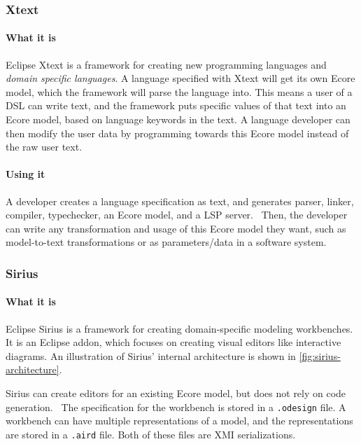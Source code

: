 \subsubsection{Xtext}\label{sec:xtext}

\paragraph*{What it is}
Eclipse Xtext is a framework for creating new programming languages and \emph{domain specific languages}.
A language specified with Xtext will get its own \gls{Ecore} model, which the framework will parse the language into.
This means a user of a DSL can write text, and the framework puts specific values of that text into an Ecore model, based on language keywords in the text.
A language developer can then modify the user data by programming towards this \gls{Ecore} model instead of the raw user text.~\cite{eclipsefoundationEclipseXtext2020}

\paragraph*{Using it}
A developer creates a language specification as text, and generates parser, linker, compiler, typechecker, an \gls{Ecore} model, and a \gls{LSP} server.~\cite{eclipsefoundationXtextLanguageEngineering}
Then, the developer can write any transformation and usage of this \gls{Ecore} model they want, such as model-to-text transformations or as parameters/data in a software system.

\subsubsection{Sirius}\label{sec:sirius}
\paragraph*{What it is} Eclipse Sirius is a framework for creating  domain-specific modeling workbenches.~\cite{eclipsefoundationSiriusEasiestWay}
It is an \gls{Eclipse} addon, which focuses on creating visual editors like interactive diagrams.
An illustration of Sirius' internal architecture is shown in \cref{fig:sirius-architecture}.

Sirius can create editors for an existing \gls{Ecore} model, but does not rely on code generation.~\cite{eclipsefoundationSiriusEasiestWay}
The specification for the workbench is stored in a \texttt{.odesign} file.
A workbench can have multiple representations of a model, and the representations are stored in a \texttt{.aird} file.
Both of these files are \acrshort{XMI} serializations.

